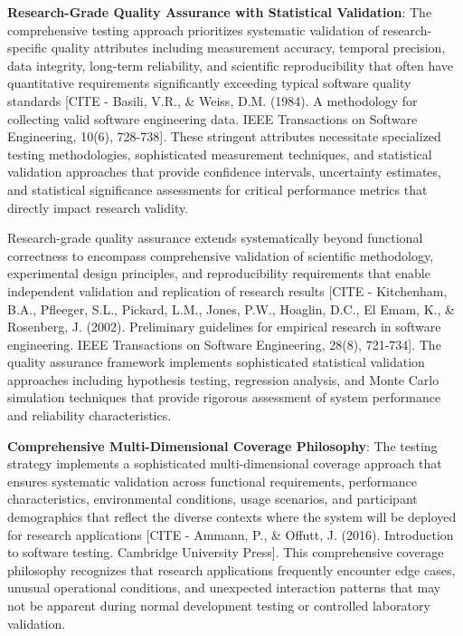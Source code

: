 \documentclass[12pt,a4paper]{report}
\begin{document}
\textbf{Research-Grade Quality Assurance with Statistical Validation}: The comprehensive testing approach prioritizes
systematic validation of research-specific quality attributes including measurement accuracy, temporal precision, data
integrity, long-term reliability, and scientific reproducibility that often have quantitative requirements significantly
exceeding typical software quality
standards [CITE - Basili, V.R., \& Weiss, D.M. (1984). A methodology for collecting valid software engineering data. IEEE Transactions on Software Engineering, 10(6), 728-738].
These stringent attributes necessitate specialized testing methodologies, sophisticated measurement techniques, and
statistical validation approaches that provide confidence intervals, uncertainty estimates, and statistical significance
assessments for critical performance metrics that directly impact research validity.

Research-grade quality assurance extends systematically beyond functional correctness to encompass comprehensive
validation of scientific methodology, experimental design principles, and reproducibility requirements that enable
independent validation and replication of research
results [CITE - Kitchenham, B.A., Pfleeger, S.L., Pickard, L.M., Jones, P.W., Hoaglin, D.C., El Emam, K., \& Rosenberg, J. (2002). Preliminary guidelines for empirical research in software engineering. IEEE Transactions on Software Engineering, 28(8), 721-734].
The quality assurance framework implements sophisticated statistical validation approaches including hypothesis testing,
regression analysis, and Monte Carlo simulation techniques that provide rigorous assessment of system performance and
reliability characteristics.

\textbf{Comprehensive Multi-Dimensional Coverage Philosophy}: The testing strategy implements a sophisticated
multi-dimensional coverage approach that ensures systematic validation across functional requirements, performance
characteristics, environmental conditions, usage scenarios, and participant demographics that reflect the diverse
contexts where the system will be deployed for research
applications [CITE - Ammann, P., \& Offutt, J. (2016). Introduction to software testing. Cambridge University Press].
This comprehensive coverage philosophy recognizes that research applications frequently encounter edge cases, unusual
operational conditions, and unexpected interaction patterns that may not be apparent during normal development testing
or controlled laboratory validation.
\end{document}
